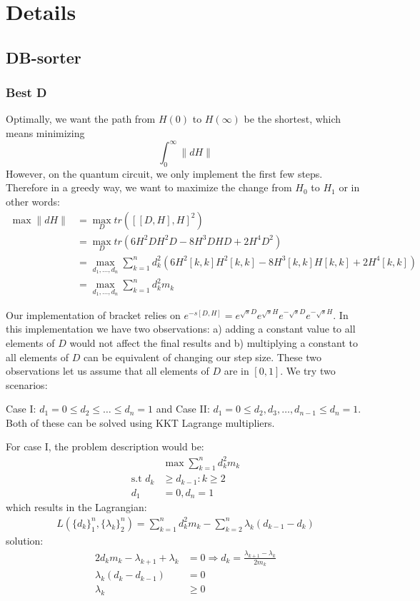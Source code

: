 \documentclass[11pt]{article}
\begin{document}
\section{Details}
\subsection{DB-sorter}
\subsubsection{Best D}
\label{sec:optimum-D}
Optimally, we want the path from $H(0)$ to $H(\infty)$ be the shortest, which means minimizing 
$$
\int^\infty_0 \lVert dH \rVert
$$
However, on the quantum circuit, we only implement the first few steps. Therefore in a greedy way, we want to maximize the change from $H_0$ to $H_1$ or in other words:
\begin{align}
    \max \lVert dH \rVert &= \max_D tr([[D, H], H]^2) \\
    &=\max_D tr(6H^2DH^2D - 8H^3DHD + 2H^4D^2) \\
    &= \max_{d_1, \dots, d_n} \sum_{k=1}^n{d_k^2(6H^2[k,k]H^2[k,k] - 8H^3[k,k]H[k,k] + 2H^4[k,k])} \\
    &= \max_{d_1, \dots, d_n} \sum_{k=1}^n{d_k^2m_k}
\end{align}

Our implementation of bracket relies on $e^{-s[D, H]} = e^{\sqrt{s}D}e^{\sqrt{s}H}e^{-\sqrt{s}D}e^{-\sqrt{s}H}$. In this implementation we have two observations: a) adding a constant value to all elements of $D$ would not affect the final results and b) multiplying a constant to all elements of $D$ can be equivalent of changing our step size. These two observations let us assume that all elements of $D$ are in $[0, 1]$. We try two scenarios:

Case I: $d_1 = 0 \le d_2 \le \dots \le d_n = 1$ and Case II: $d_1 = 0 \le d_2, d_3, \dots, d_{n-1} \le d_n = 1$.
Both of these can be solved using KKT Lagrange multipliers.

For case I, the problem description would be:
\begin{align}
    &\max \sum_{k=1}^n{d_k^2m_k} \\
    \text{s.t } d_k &\ge d_{k-1}: k\ge 2\\
    d_1 &= 0, d_n = 1
\end{align}
which results in the Lagrangian:
\begin{align}
    L(\{d_k\}^n_1, \{\lambda_k\}^n_2) = \sum_{k=1}^n{d_k^2m_k} - \sum_{k=2}^n{\lambda_k(d_{k-1} - d_k)}
\end{align}
solution:
\begin{align}
    2d_km_k - \lambda_{k+1} + \lambda_k &= 0 \Rightarrow d_k = \frac{\lambda_{k+1} - \lambda_k}{2m_k}\\
    \lambda_k(d_k - d_{k-1}) &= 0 \\
    \lambda_k &\ge 0
\end{align}
\end{document}
